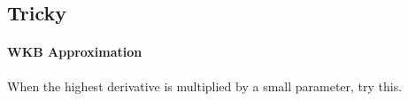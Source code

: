 \documentclass[12pt,a4paper]{book}
\begin{document}
\subsection{Tricky}

\paragraph{WKB Approximation}

When the highest derivative is multiplied by a small parameter, try this.












\end{document}
